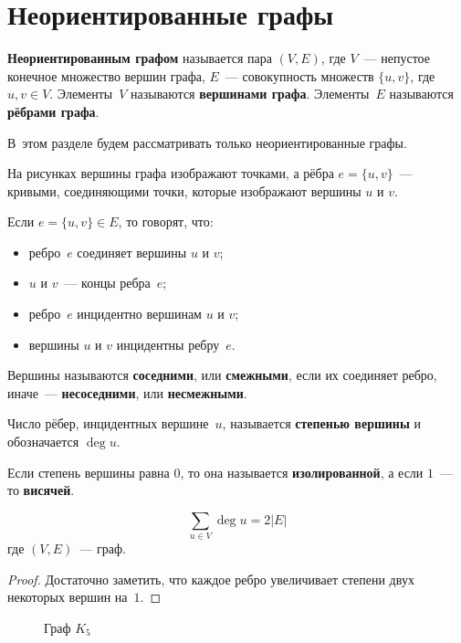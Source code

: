 \section{Неориентированные графы}
 \textbf{Неориентированным графом} называется пара $(V, E)$, где $V$~--- непустое конечное множество вершин графа, $E$~--- совокупность множеств $\{ u, v \}$, где $u, v \in V$.
Элементы~$V$ называются \textbf{вершинами графа}.
Элементы~$E$ называются \textbf{рёбрами графа}.

В~этом разделе будем рассматривать только неориентированные графы.

На рисунках вершины графа изображают точками, а рёбра $e = \{ u, v \}$~--- кривыми, соединяющими точки, которые изображают вершины $u$ и $v$.

Если $e = \{ u, v \} \in E$, то говорят, что:
\begin{itemize}
	\item ребро~$e$ соединяет вершины $u$ и $v$;
	\item $u$ и $v$~--- концы ребра~$e$;
	\item ребро~$e$ инцидентно вершинам $u$ и $v$;
	\item вершины $u$ и $v$ инцидентны ребру~$e$.
\end{itemize}

Вершины называются \textbf{соседними}, или \textbf{смежными}, если их соединяет ребро, иначе~--- \textbf{несоседними}, или \textbf{несмежными}.

 Число рёбер, инцидентных вершине~$u$, называется \textbf{степенью вершины} и обозначается $\deg u$.

Если степень вершины равна $0$, то она называется \textbf{изолированной}, а если $1$~--- то \textbf{висячей}.

\begin{lemma}[о~рукопожатиях]
\begin{equation*}
\sum_{u \in V} \deg u = 2|E|
\end{equation*}
где $(V, E)$~--- граф.
\end{lemma}
\begin{proof}
Достаточно заметить, что каждое ребро увеличивает степени двух некоторых вершин на~$1$.
\end{proof}

\begin{wrapfigure}{r}{0pt}
\noindent
{}
\caption{Граф $K_5$}
\end{wrapfigure}

